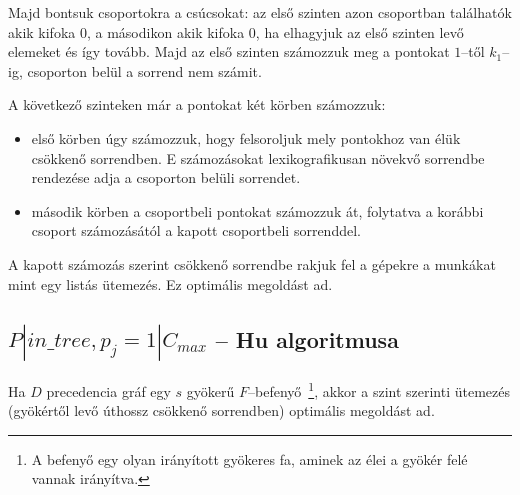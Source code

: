 Majd bontsuk csoportokra a csúcsokat: az első szinten azon csoportban találhatók
akik kifoka $0$, a másodikon akik kifoka $0$, ha elhagyjuk az első szinten levő
elemeket és így tovább. Majd az első szinten számozzuk meg a pontokat $1$--től
$k_1$--ig, csoporton belül a sorrend nem számit.

A következő szinteken már a pontokat két körben számozzuk:
\begin{itemize}
	\item első körben úgy számozzuk, hogy felsoroljuk mely pontokhoz van élük
	      csökkenő sorrendben. E számozásokat lexikografikusan növekvő sorrendbe
	      rendezése adja a csoporton belüli sorrendet.
	\item második körben a csoportbeli pontokat számozzuk át, folytatva a korábbi
	      csoport számozásától a kapott csoportbeli sorrenddel.
\end{itemize}

A kapott számozás szerint csökkenő sorrendbe rakjuk fel a gépekre a munkákat mint
egy listás ütemezés. Ez optimális megoldást ad.


\subsection{ \texorpdfstring {$ P|in\_tree, p_j=1|C_{max} $} {P|in-tree,pj=1|Cmax} -- Hu algoritmusa}

Ha $D$ precedencia gráf egy $s$ gyökerű $F$--befenyő~\footnote{A befenyő egy
	olyan irányított gyökeres fa, aminek az élei a gyökér felé vannak irányítva.},
akkor a szint szerinti ütemezés (gyökértől levő úthossz csökkenő sorrendben)
optimális megoldást ad.
